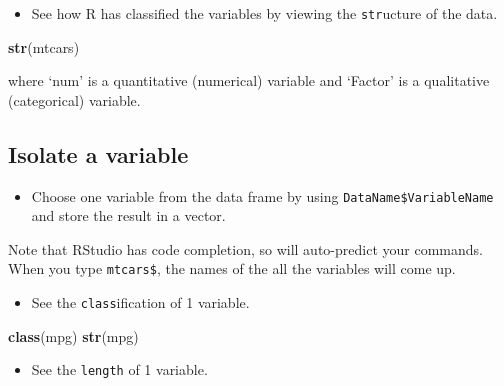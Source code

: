 \documentclass[]{article}
\newenvironment{Shaded}{\begin{snugshade}}{\end{snugshade}}
\newcommand{\KeywordTok}[1]{\textcolor[rgb]{0.13,0.29,0.53}{\textbf{#1}}}
\newcommand{\NormalTok}[1]{#1}
\newcommand{\OperatorTok}[1]{\textcolor[rgb]{0.81,0.36,0.00}{\textbf{#1}}}
\newcommand{\StringTok}[1]{\textcolor[rgb]{0.31,0.60,0.02}{#1}}
\providecommand{\tightlist}{%
  \setlength{\itemsep}{0pt}\setlength{\parskip}{0pt}}
\begin{document}
\begin{itemize}
\tightlist
\item
  See how R has classified the variables by viewing the \texttt{str}ucture of the data.
\end{itemize}

\begin{Shaded}
\begin{Highlighting}[]
\KeywordTok{str}\NormalTok{(mtcars)}
\end{Highlighting}
\end{Shaded}

where `num' is a quantitative (numerical) variable and `Factor' is a qualitative (categorical) variable.

\hypertarget{isolate-a-variable}{%
\subsection{Isolate a variable}\label{isolate-a-variable}}

\begin{itemize}
\tightlist
\item
  Choose one variable from the data frame by using \texttt{DataName\$VariableName} and store the result in a vector.
\end{itemize}

\begin{Shaded}
\end{Shaded}

Note that RStudio has code completion, so will auto-predict your commands. When you type \texttt{mtcars\$}, the names of the all the variables will come up.

\begin{itemize}
\tightlist
\item
  See the \texttt{class}ification of 1 variable.
\end{itemize}

\begin{Shaded}
\begin{Highlighting}[]
\KeywordTok{class}\NormalTok{(mpg)}
\KeywordTok{str}\NormalTok{(mpg)}
\end{Highlighting}
\end{Shaded}

\begin{itemize}
\tightlist
\item
  See the \texttt{length} of 1 variable.
\end{itemize}
\end{document}
